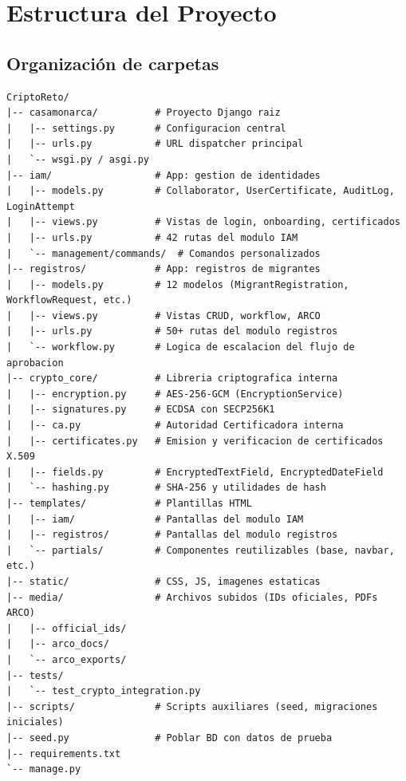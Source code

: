 \documentclass[10pt,letterpaper]{report}
\begin{document}
\chapter{Estructura del Proyecto}

\section{Organización de carpetas}

\begin{lstlisting}
CriptoReto/
|-- casamonarca/          # Proyecto Django raiz
|   |-- settings.py       # Configuracion central
|   |-- urls.py           # URL dispatcher principal
|   `-- wsgi.py / asgi.py
|-- iam/                  # App: gestion de identidades
|   |-- models.py         # Collaborator, UserCertificate, AuditLog, LoginAttempt
|   |-- views.py          # Vistas de login, onboarding, certificados
|   |-- urls.py           # 42 rutas del modulo IAM
|   `-- management/commands/  # Comandos personalizados
|-- registros/            # App: registros de migrantes
|   |-- models.py         # 12 modelos (MigrantRegistration, WorkflowRequest, etc.)
|   |-- views.py          # Vistas CRUD, workflow, ARCO
|   |-- urls.py           # 50+ rutas del modulo registros
|   `-- workflow.py       # Logica de escalacion del flujo de aprobacion
|-- crypto_core/          # Libreria criptografica interna
|   |-- encryption.py     # AES-256-GCM (EncryptionService)
|   |-- signatures.py     # ECDSA con SECP256K1
|   |-- ca.py             # Autoridad Certificadora interna
|   |-- certificates.py   # Emision y verificacion de certificados X.509
|   |-- fields.py         # EncryptedTextField, EncryptedDateField
|   `-- hashing.py        # SHA-256 y utilidades de hash
|-- templates/            # Plantillas HTML
|   |-- iam/              # Pantallas del modulo IAM
|   |-- registros/        # Pantallas del modulo registros
|   `-- partials/         # Componentes reutilizables (base, navbar, etc.)
|-- static/               # CSS, JS, imagenes estaticas
|-- media/                # Archivos subidos (IDs oficiales, PDFs ARCO)
|   |-- official_ids/
|   |-- arco_docs/
|   `-- arco_exports/
|-- tests/
|   `-- test_crypto_integration.py
|-- scripts/              # Scripts auxiliares (seed, migraciones iniciales)
|-- seed.py               # Poblar BD con datos de prueba
|-- requirements.txt
`-- manage.py
\end{lstlisting}
\end{document}
